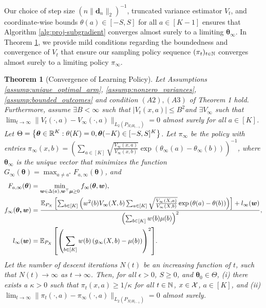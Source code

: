 \documentclass{article}
\newtheorem{theorem}{Theorem}
\begin{document}
Our choice of step size $(n \|\bm{d}_n\|_2)^{-1}$, truncated variance estimator $V_t$, and coordinate-wise bounds $\theta(a) \in [-S, S]$ for all $a \in [K-1]$ ensures that Algorithm \ref{alg:proj-subgradient} converges almost surely to a limiting $\bm{\theta}_\infty$. In Theorem \ref{thm:projected_subgradient_descent_convergence}, we provide mild conditions regarding the boundedness and convergence of $V_t$ that ensure our sampling policy sequence $(\pi_t)_{t \in \mathbb{N}}$ converges almost surely to a limiting policy ${\pi}_\infty$. 


\begin{theorem}[Convergence of Learning Policy]\label{thm:projected_subgradient_descent_convergence}
    Let Assumptions \ref{assump:unique_optimal_arm}, \ref{assump:nonzero_variances}, \ref{assump:bounded_outcomes} and condition $(A2), (A3)$ of Theorem 1 hold. Furthermore, assume  $\exists B < \infty$ such that $|V_t(x,a)| \leq B^2 $and $\exists V_\infty$ such that $\lim_{t \rightarrow \infty}\|V_t(\cdot, a) - V_\infty(\cdot, a) \|_{L_2\left(P_{X|H_{t-1}}\right)} = 0$ almost surely for all $a \in [K]$. Let ${\Theta} = \left\{\boldsymbol{\theta} \in \mathbb{R}^K: \theta(K) = 0, \boldsymbol{\theta}(-K) \in [-S,S]^K\right\}$. 
    Let $\pi_\infty$ be the policy with entries $\pi_\infty(x,b) = \left(\sum_{a \in [K]}\sqrt{\frac{V_\infty(x,a)}{V_\infty(x,b)}}\exp\left(\theta_\infty(a) - \theta_\infty(b)\right)\right)^{-1}$, where $\bm{\theta}_\infty$ is the unique vector that minimizes the function $G_\infty(\bm{\theta})= \max_{a \neq a^*} F_{a, \infty}(\bm{\theta})$, and 
    \begin{align}
        F_{a,\infty}(\boldsymbol{\theta}) &= \min_{\boldsymbol{w} \in \Delta(a), \boldsymbol{w}^\top \boldsymbol{\mu} \geq 0} f_{\infty}(\boldsymbol\theta, \boldsymbol{w}), \\
        f_\infty(\boldsymbol{\theta, \boldsymbol{w}}) &= \frac{\mathbb{E}_{P_X}\left[ \sum_{b \in [K]} \left(w^2(b) V_\infty(X,b) \sum_{a \in [K]}\sqrt{\frac{V_\infty(X,a)}{V_\infty(X,b)}}\exp\left(\theta(a) - \theta(b)\right)\right) \right] + l_\infty(\boldsymbol{w})}{\left(\sum_{b \in [K]}w(b)\mu(b) \right)^2}, \\
        l_\infty(\boldsymbol{w}) &= {\mathbb{E}_{P_X}\left[ \left(\sum_{b \in [K]} w(b)\left(g_\infty(X, b) - \mu(b) \right) \right)^2 \right]}.
    \end{align}
     Let the number of descent iterations $N(t)$ be an increasing function of $t$, such that $N(t) \rightarrow \infty$ as $t \rightarrow \infty$. Then, for all $\epsilon > 0$, $S \geq 0$, and $\bm{\theta}_0 \in {\Theta}$, (i) there exists a $\kappa > 0$ such that $\pi_t(x,a) \geq 1/\kappa$ for all $t \in \mathbb{N}$, $x \in \mathcal{X}$, $a \in [K]$, and (ii) $\lim_{t\rightarrow \infty}\|\pi_t(\cdot,a) - \pi_\infty(\cdot,a) \|_{L_2\left(P_{X|H_{t-1}}\right)} = 0$ almost surely. 
     

\end{theorem}
\end{document}
